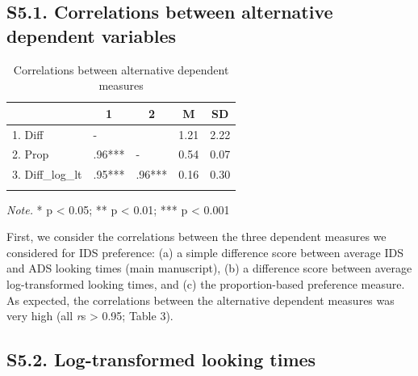 \documentclass[
  man, donotrepeattitle,floatsintext]{apa6}
\begin{document}
\hypertarget{s5.1.-correlations-between-alternative-dependent-variables}{%
\subsection{S5.1. Correlations between alternative dependent variables}\label{s5.1.-correlations-between-alternative-dependent-variables}}

\begin{table}[tbp]

\begin{center}
\begin{threeparttable}

\caption{\label{tab:unnamed-chunk-29}Correlations between alternative dependent measures}

\begin{tabular}{lllll}
\toprule
 & \multicolumn{1}{c}{1} & \multicolumn{1}{c}{2} & \multicolumn{1}{c}{M} & \multicolumn{1}{c}{SD}\\
\midrule
1. Diff & - &  & 1.21 & 2.22\\
2. Prop & .96*** & - & 0.54 & 0.07\\
3. Diff\_log\_lt & .95*** & .96*** & 0.16 & 0.30\\
\bottomrule
\addlinespace
\end{tabular}

\begin{tablenotes}[para]
\normalsize{\textit{Note.} * p < 0.05; ** p < 0.01; *** p < 0.001}
\end{tablenotes}

\end{threeparttable}
\end{center}

\end{table}

First, we consider the correlations between the three dependent measures we considered for IDS preference: (a) a simple difference score between average IDS and ADS looking times (main manuscript), (b) a difference score between average log-transformed looking times, and (c) the proportion-based preference measure. As expected, the correlations between the alternative dependent measures was very high (all \emph{r}s \textgreater{} 0.95; Table 3).

\hypertarget{s5.2.-log-transformed-looking-times}{%
\subsection{S5.2. Log-transformed looking times}\label{s5.2.-log-transformed-looking-times}}
\end{document}
